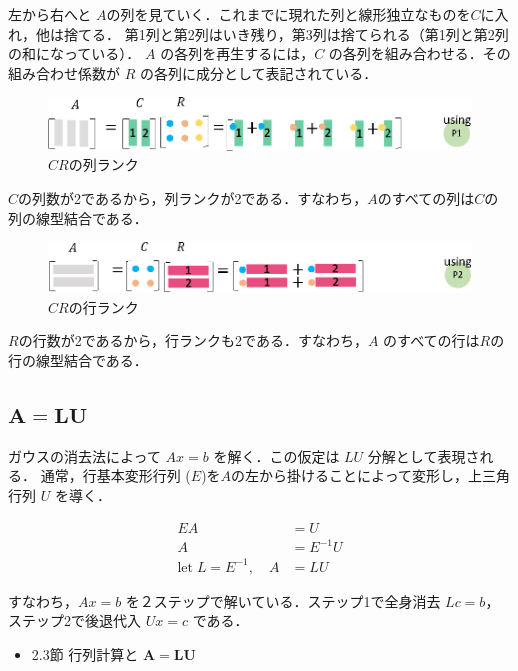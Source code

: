 \documentclass[letterpaper]{article}
\begin{document}
左から右へと $A$の列を見ていく．これまでに現れた列と線形独立なものを$C$に入れ，他は捨てる．
第1列と第2列はいき残り，第3列は捨てられる（第1列と第2列の和になっている）．
$A$ の各列を再生するには，$C$ の各列を組み合わせる．その組み合わせ係数が $R$ の各列に成分として表記されている．

\begin{figure}[H]
  \includegraphics[keepaspectratio, width=\linewidth]{CR1.eps}
  \caption{$CR$の列ランク}
\end{figure}

$C$の列数が2であるから，列ランクが2である．すなわち，$A$のすべての列は$C$の列の線型結合である．

\begin{figure}[H]
  \includegraphics[keepaspectratio, width=\linewidth]{CR2.eps}
  \caption{$CR$の行ランク}
\end{figure}

$R$の行数が2であるから，行ランクも2である．すなわち，$A$ のすべての行は$R$の行の線型結合である．

\clearpage

\subsection{$\boldsymbol{A=LU}$}

ガウスの消去法によって $Ax=b$ を解く．この仮定は $LU$ 分解として表現される．
通常，行基本変形行列 ($E$)を$A$の左から掛けることによって変形し，上三角行列 $U$ を導く．

\begin{align*}
  EA &= U\\
  A &= E^{-1}U\\
\text{let} \; L = E^{-1}, \quad  A &= LU
\end{align*}

すなわち，$Ax=b$ を２ステップで解いている．ステップ1で全身消去 $Lc=b$，ステップ2で後退代入 $Ux=c$ である．

\begin{itemize}
  \item 2.3節 行列計算と $\bm{A=LU}$
\end{itemize}
\end{document}
